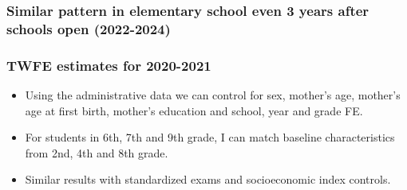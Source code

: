 \documentclass{beamer}
\begin{document}
\begin{frame}
    \label{frame:twfe_gpa_2_4_8}
    \frametitle{Similar pattern in elementary school even 3 years after schools open (2022-2024)}
        {
    }
\end{frame}


\begin{frame}
    \label{frame:twfe_gpa_controls_intro}
    \frametitle{TWFE estimates for 2020-2021}
       \begin{itemize}
           \item Using the administrative data we can control for sex, mother's age, mother's age at first birth, mother's education and school, year and grade FE.
           \item For students in 6th, 7th and 9th grade, I can match baseline characteristics from 2nd, 4th and 8th grade.
           \item Similar results with standardized exams and socioeconomic index controls.


       \end{itemize}
\end{frame}
\end{document}

